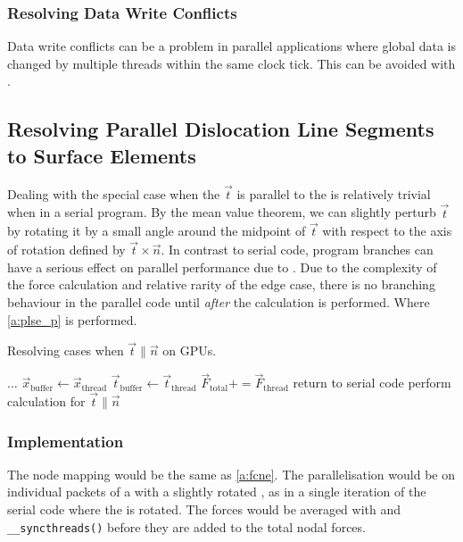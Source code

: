 	\subsubsection{Resolving Data Write Conflicts}
	Data write conflicts can be a problem in parallel applications where global data is changed by multiple threads within the same clock tick. This can be avoided with .
	\subsection[Parallel Dislocation Line Segments to Surface Elements]{Resolving Parallel Dislocation Line Segments to Surface Elements}
	Dealing with the special case when the  $ \vec{t} $ is parallel to the  is relatively trivial when in a serial program. By the mean value theorem, we can slightly perturb $ \vec{t} $ by rotating it by a small angle around the midpoint of $ \vec{t} $ with respect to the axis of rotation defined by $ \vec{t} \times \vec{n} $. In contrast to serial code, program branches can have a serious effect on parallel performance due to . Due to the complexity of the force calculation and relative rarity of the edge case, there is no branching behaviour in the parallel code until \emph{after} the calculation is performed. Where \cref{a:plse_p} is performed.
	\begin{algorithm}
		\caption{Resolving cases when $ \vec{t} \parallel \vec{n} $ on GPUs.}
		\label{a:plse_p}
		\begin{algorithmic}
			\State $ \ldots $
			\State $ \vec{x}_{\textrm{buffer}} \gets \vec{x}_{\textrm{thread}} $
			\State $ \vec{t}_{\textrm{buffer}} \gets \vec{t}_{\textrm{thread}} $
			\Else
			\State $ \vec{F}_{\textrm{total}} += \vec{F}_{\textrm{thread}} $
			\EndIf
			\EndFor
			\State return to serial code
			\State perform calculation for $ \vec{t} \parallel \vec{n} $
			\EndFor
			\EndIf
		\end{algorithmic}
	\end{algorithm}
	\subsubsection{Implementation}
	The node mapping would be the same as \cref{a:fcne}. The parallelisation would be on individual packets of a  with a slightly rotated , as in a single iteration of the serial code where the  is rotated. The forces would be averaged with  and \texttt{__syncthreads()} before they are added to the total nodal forces.
	
